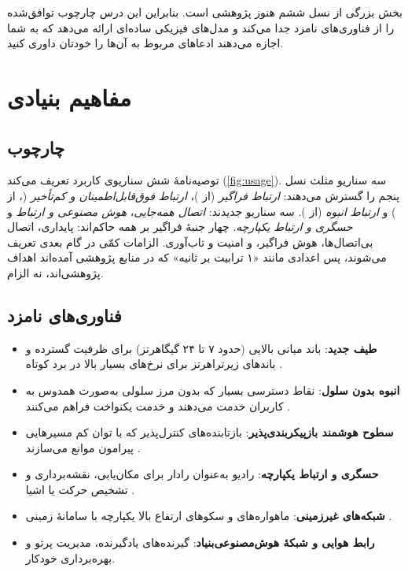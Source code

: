 \documentclass[11pt,a4paper]{article}
\begin{document}
بخش بزرگی از نسل ششم هنوز پژوهشی است. بنابراین این درس چارچوب توافق‌شده را از فناوری‌های نامزد جدا می‌کند و مدل‌های فیزیکی ساده‌ای ارائه
می‌دهد که به شما اجازه می‌دهند ادعاهای مربوط به آن‌ها را خودتان داوری کنید.

\section{مفاهیم بنیادی}

\subsection{چارچوب }
توصیه‌نامهٔ  \cite{itu2023m2160} شش سناریوی کاربرد تعریف می‌کند (\cref{fig:usage}). سه سناریو مثلث نسل پنجم را گسترش می‌دهند:
\emph{ارتباط فراگیر} (از )، \emph{ارتباط فوق‌قابل‌اطمینان و کم‌تأخیر} (، از ) و \emph{ارتباط انبوه} (از ). سه
سناریو جدیدند: \emph{اتصال همه‌جایی}، \emph{هوش مصنوعی و ارتباط} و \emph{حسگری و ارتباط یکپارچه}. چهار جنبهٔ فراگیر بر همه حاکم‌اند: پایداری، اتصال
بی‌اتصال‌ها، هوش فراگیر، و امنیت و تاب‌آوری. الزامات کمّی در گام بعدی  تعریف می‌شوند، پس اعدادی مانند «۱ ترابیت بر ثانیه» که در منابع
پژوهشی آمده‌اند اهداف پژوهشی‌اند، نه الزام.

\begin{acnfigure}
  \caption{سناریوهای کاربرد و جنبه‌های فراگیر  (بر اساس ).}
  \label{fig:usage}
\end{acnfigure}

\subsection{فناوری‌های نامزد}
\begin{itemize}
  \item \textbf{طیف جدید}: باند میانی بالایی (حدود ۷ تا ۲۴ گیگاهرتز) برای ظرفیت گسترده و باندهای زیرتراهرتز برای نرخ‌های بسیار بالا در برد کوتاه
        \cite{rappaport2019above100}.
  \item \textbf{ انبوه بدون سلول}: نقاط دسترسی بسیار که بدون مرز سلولی به‌صورت همدوس به کاربران خدمت می‌دهند و خدمت یکنواخت فراهم می‌کنند
        \cite{ngo2017cellfree}.
  \item \textbf{سطوح هوشمند بازپیکربندی‌پذیر}: بازتابنده‌های کنترل‌پذیر که با توان کم مسیرهایی پیرامون موانع می‌سازند \cite{wu2019irs}.
  \item \textbf{حسگری و ارتباط یکپارچه}: رادیو به‌عنوان رادار برای مکان‌یابی، نقشه‌برداری و تشخیص حرکت یا اشیا \cite{liu2022isac}.
  \item \textbf{شبکه‌های غیرزمینی}: ماهواره‌های  و سکوهای ارتفاع بالا یکپارچه با سامانهٔ زمینی \cite{tr38811}.
  \item \textbf{رابط هوایی و شبکهٔ هوش‌مصنوعی‌بنیاد}: گیرنده‌های یادگیرنده، مدیریت پرتو و بهره‌برداری خودکار.
\end{itemize}
\end{document}
